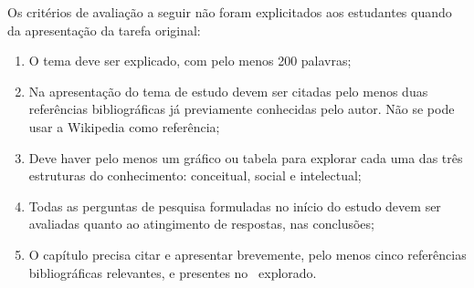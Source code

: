 Os critérios de avaliação a seguir não foram explicitados aos estudantes quando da apresentação da tarefa original:
\begin{enumerate}
    \item O tema deve ser explicado, com pelo menos 200 palavras;
    \item Na apresentação do tema de estudo devem ser citadas pelo menos duas referências bibliográficas já previamente conhecidas pelo autor. Não se pode usar a Wikipedia como referência;
    \item Deve haver pelo menos um gráfico ou tabela para explorar cada uma das três estruturas do conhecimento: conceitual, social e intelectual;
    \item Todas as perguntas de pesquisa formuladas no início do estudo devem ser avaliadas quanto ao atingimento de respostas, nas conclusões;  
    \item O capítulo precisa citar e apresentar brevemente, pelo menos cinco referências bibliográficas relevantes, e presentes no \dataset\ explorado.
\end{enumerate}
